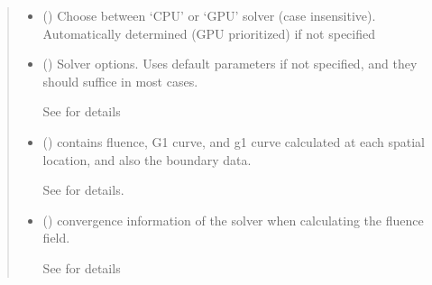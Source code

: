 \documentclass[letterpaper,10pt,english]{sphinxmanual}
\begin{document}
\begin{fulllineitems}
\begin{fulllineitems}
\begin{quote}
\begin{description}
\begin{itemize}
\item {} 
\sphinxAtStartPar
{} (\sphinxstyleliteralemphasis{\sphinxupquote{, }}) \textendash{} Choose between ‘CPU’ or ‘GPU’ solver (case insensitive). Automatically determined (GPU prioritized) if not specified

\item {} 
\sphinxAtStartPar
{} ({\hyperref[\detokenize{_autosummary/nirfasterff.utils.SolverOptions:nirfasterff.utils.SolverOptions}]{}}\sphinxstyleliteralemphasis{\sphinxupquote{, }}) \textendash{} 
\sphinxAtStartPar
Solver options. Uses default parameters if not specified, and they should suffice in most cases.

\sphinxAtStartPar
See {\hyperref[\detokenize{_autosummary/nirfasterff.utils.SolverOptions:nirfasterff.utils.SolverOptions}]{}} for details


\end{itemize}

\sphinxAtStartPar
\begin{itemize}
\item {} 
\sphinxAtStartPar
{} () \textendash{} contains fluence, G1 curve, and g1 curve calculated at each spatial location, and also the boundary data.

\sphinxAtStartPar
See {\hyperref[\detokenize{_autosummary/nirfasterff.base.data.DCSdata:nirfasterff.base.data.DCSdata}]{}} for details.

\item {} 
\sphinxAtStartPar
{} () \textendash{} convergence information of the solver when calculating the fluence field.

\sphinxAtStartPar
See {\hyperref[\detokenize{_autosummary/nirfasterff.utils.ConvergenceInfo:nirfasterff.utils.ConvergenceInfo}]{}} for details

\end{itemize}



\end{description}
\end{quote}
\end{fulllineitems}
\end{fulllineitems}
\end{document}
